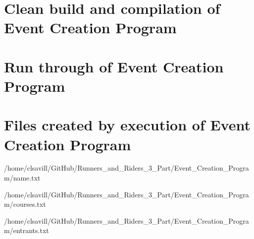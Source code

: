 \documentclass[a4paper,12pt]{article}
\begin{document}
\section{Clean build and compilation of Event Creation Program}


\section{Run through of Event Creation Program}


\section{Files created by execution of Event Creation Program}

{/home/clsavill/GitHub/Runners_and_Riders_3_Part/Event_Creation_Program/name.txt}


{/home/clsavill/GitHub/Runners_and_Riders_3_Part/Event_Creation_Program/courses.txt}


{/home/clsavill/GitHub/Runners_and_Riders_3_Part/Event_Creation_Program/entrants.txt}
\end{document}
